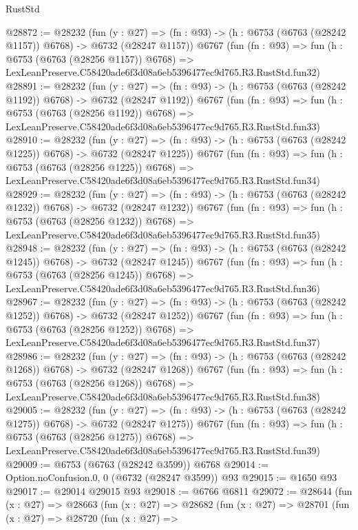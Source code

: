 \begin{lexlean}{RustStd}
\begin{coremodule}
@28872 := @28232
    (fun (y : @27) =>
    (fn : @93) -> (h : @6753 (@6763 (@28242 @1157)) @6768) -> @6732 (@28247 @1157))
    @6767
    (fun (fn : @93) =>
    fun (h : @6753 (@6763 (@28256 @1157)) @6768) =>
    LexLeanPreserve.C58420ade6f3d08a6eb5396477ec9d765.R3.RustStd.fun32)
@28891 := @28232
    (fun (y : @27) =>
    (fn : @93) -> (h : @6753 (@6763 (@28242 @1192)) @6768) -> @6732 (@28247 @1192))
    @6767
    (fun (fn : @93) =>
    fun (h : @6753 (@6763 (@28256 @1192)) @6768) =>
    LexLeanPreserve.C58420ade6f3d08a6eb5396477ec9d765.R3.RustStd.fun33)
@28910 := @28232
    (fun (y : @27) =>
    (fn : @93) -> (h : @6753 (@6763 (@28242 @1225)) @6768) -> @6732 (@28247 @1225))
    @6767
    (fun (fn : @93) =>
    fun (h : @6753 (@6763 (@28256 @1225)) @6768) =>
    LexLeanPreserve.C58420ade6f3d08a6eb5396477ec9d765.R3.RustStd.fun34)
@28929 := @28232
    (fun (y : @27) =>
    (fn : @93) -> (h : @6753 (@6763 (@28242 @1232)) @6768) -> @6732 (@28247 @1232))
    @6767
    (fun (fn : @93) =>
    fun (h : @6753 (@6763 (@28256 @1232)) @6768) =>
    LexLeanPreserve.C58420ade6f3d08a6eb5396477ec9d765.R3.RustStd.fun35)
@28948 := @28232
    (fun (y : @27) =>
    (fn : @93) -> (h : @6753 (@6763 (@28242 @1245)) @6768) -> @6732 (@28247 @1245))
    @6767
    (fun (fn : @93) =>
    fun (h : @6753 (@6763 (@28256 @1245)) @6768) =>
    LexLeanPreserve.C58420ade6f3d08a6eb5396477ec9d765.R3.RustStd.fun36)
@28967 := @28232
    (fun (y : @27) =>
    (fn : @93) -> (h : @6753 (@6763 (@28242 @1252)) @6768) -> @6732 (@28247 @1252))
    @6767
    (fun (fn : @93) =>
    fun (h : @6753 (@6763 (@28256 @1252)) @6768) =>
    LexLeanPreserve.C58420ade6f3d08a6eb5396477ec9d765.R3.RustStd.fun37)
@28986 := @28232
    (fun (y : @27) =>
    (fn : @93) -> (h : @6753 (@6763 (@28242 @1268)) @6768) -> @6732 (@28247 @1268))
    @6767
    (fun (fn : @93) =>
    fun (h : @6753 (@6763 (@28256 @1268)) @6768) =>
    LexLeanPreserve.C58420ade6f3d08a6eb5396477ec9d765.R3.RustStd.fun38)
@29005 := @28232
    (fun (y : @27) =>
    (fn : @93) -> (h : @6753 (@6763 (@28242 @1275)) @6768) -> @6732 (@28247 @1275))
    @6767
    (fun (fn : @93) =>
    fun (h : @6753 (@6763 (@28256 @1275)) @6768) =>
    LexLeanPreserve.C58420ade6f3d08a6eb5396477ec9d765.R3.RustStd.fun39)
@29009 := @6753 (@6763 (@28242 @3599)) @6768
@29014 := Option.noConfusion.{0, 0} (@6732 (@28247 @3599)) @93
@29015 := @1650 @93
@29017 := @29014 @29015 @93
@29018 := @6766 @6811
@29072 := @28644
    (fun (x : @27) =>
    @28663
      (fun (x : @27) =>
      @28682
        (fun (x : @27) =>
        @28701
          (fun (x : @27) =>
          @28720
            (fun (x : @27) =>

\end{coremodule}
\end{lexlean}

